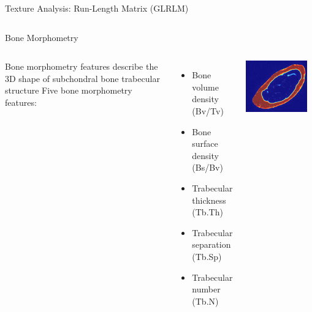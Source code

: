\documentclass[10pt,aspectratio=169]{beamer}
\begin{document}
\begin{frame}{Texture Analysis: Run-Length Matrix (GLRLM)}
\begin{columns}[onlytextwidth]
\begin{columns}
    \end{columns}
  \end{columns}
\end{frame}

\begin{frame}{Bone Morphometry}

  \begin{columns}[onlytextwidth]
    Bone morphometry features describe the 3D shape of subchondral bone trabecular structure
    Five bone morphometry features:
    \begin{itemize} \itemsep0.5em
      \item Bone volume density (Bv/Tv)
      \item Bone surface density (Bs/Bv)
      \item Trabecular thickness (Tb.Th)
      \item Trabecular separation (Tb.Sp)
      \item Trabecular number (Tb.N)
    \end{itemize}
    \begin{columns}
    \centering
    \centering
    \includegraphics[width=0.9\textwidth]{./TextureMapsImages/BM_49_LEFT_0_crop.png}\\

\end{columns}
\end{columns}
\end{frame}
\end{document}
